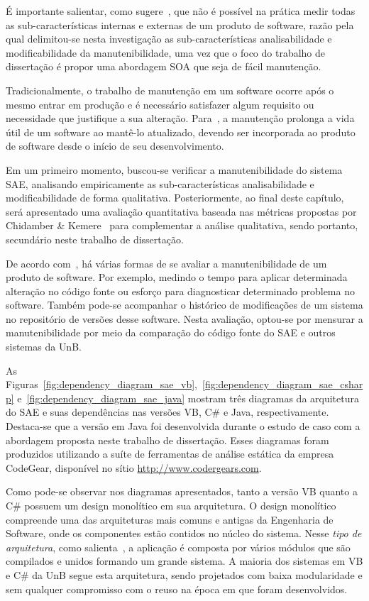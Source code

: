 É importante salientar, como sugere~\cite{fenton2014software}, que não é possível na prática
medir todas as sub-características internas e externas de um produto
de software, razão pela qual delimitou-se 
nesta investigação as sub-características analisabilidade e modificabilidade
da manutenibilidade, uma vez que o
foco do trabalho de dissertação é propor uma abordagem \acrshort{SOA} 
que seja de fácil manutenção. 

Tradicionalmente, o trabalho de manutenção em um software ocorre após o mesmo entrar em produção e é necessário satisfazer algum requisito ou necessidade que justifique a sua alteração. Para~\cite{S01_bennett2000software}, a manutenção prolonga a vida útil de um software ao mantê-lo atualizado, devendo ser incorporada ao produto de software desde o início de seu desenvolvimento.

Em um primeiro momento, buscou-se verificar a manutenibilidade do sistema \acrshort{SAE}, analisando empiricamente as sub-características analisabilidade e modificabilidade de forma qualitativa. Posteriormente, ao final deste capítulo, será apresentado uma avaliação quantitativa baseada nas métricas propostas por Chidamber \& Kemere~\cite{chidamber1994metrics} para complementar a análise qualitativa, sendo portanto, secundário neste trabalho de dissertação.

De acordo com~\cite{sant2003reuse}, há várias formas de se avaliar a manutenibilidade de um produto de software. Por exemplo, medindo o tempo para aplicar determinada alteração no código fonte ou esforço para diagnosticar determinado problema no software. Também pode-se acompanhar o histórico de modificações de um sistema no repositório de versões desse software. Nesta avaliação, optou-se por mensurar a manutenibilidade por meio da comparação do código fonte do \acrshort{SAE} e outros sistemas da \acrshort{UnB}.

As Figuras~\ref{fig:dependency_diagram_sae_vb},~\ref{fig:dependency_diagram_sae_csharp} 
e~\ref{fig:dependency_diagram_sae_java} mostram três diagramas da arquitetura do \acrshort{SAE} e suas dependências nas versões VB, C\# e Java, respectivamente. Destaca-se que a versão em Java foi desenvolvida durante o estudo de caso com a abordagem proposta neste trabalho de dissertação. Esses diagramas foram produzidos 
utilizando a suíte de ferramentas de análise estática da empresa CodeGear, 
disponível no sítio \url{http://www.codergears.com}. 

Como pode-se observar nos diagramas apresentados, tanto a versão VB quanto a C\# possuem um design monolítico em sua arquitetura. O design monolítico compreende uma das arquiteturas mais comuns e antigas da Engenharia de Software, onde os componentes estão contidos no núcleo do sistema. Nesse \emph{tipo de arquitetura}, como salienta~\cite{clements2002documenting}, a aplicação é composta por vários módulos que são compilados e unidos formando um grande sistema. A maioria dos sistemas em VB e C\# da \acrshort{UnB} segue esta arquitetura, sendo projetados com baixa modularidade e sem qualquer compromisso com o reuso na época em que foram desenvolvidos. 

